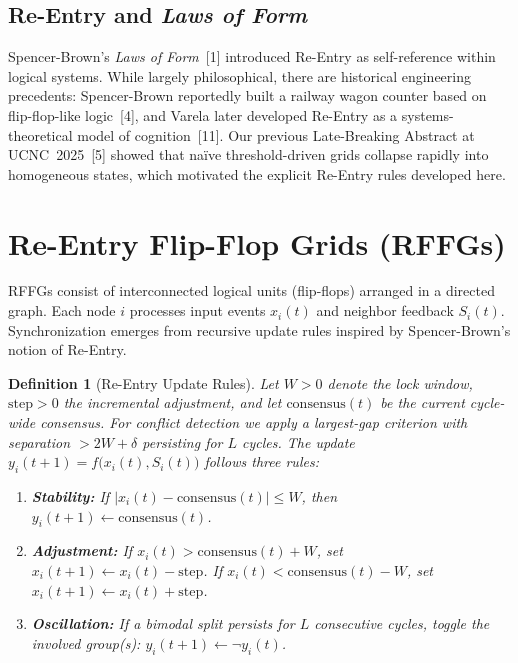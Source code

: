 \documentclass[11pt]{article}
\newtheorem{definition}{Definition}
\begin{document}
\subsection{Re-Entry and \textit{Laws of Form}}
Spencer-Brown’s \textit{Laws of Form}~[1] introduced Re-Entry as self-reference within logical systems. While largely philosophical, there are historical engineering precedents: Spencer-Brown reportedly built a railway wagon counter based on flip-flop-like logic~[4], and Varela later developed Re-Entry as a systems-theoretical model of cognition~[11]. Our previous Late-Breaking Abstract at UCNC~2025~[5] showed that naïve threshold-driven grids collapse rapidly into homogeneous states, which motivated the explicit Re-Entry rules developed here.

\section{Re-Entry Flip-Flop Grids (RFFGs)}
RFFGs consist of interconnected logical units (flip-flops) arranged in a directed graph. 
Each node $i$ processes input events $x_i(t)$ and neighbor feedback $S_i(t)$.
Synchronization emerges from recursive update rules inspired by Spencer-Brown’s notion of Re-Entry.

\begin{definition}[Re-Entry Update Rules]
Let $W>0$ denote the lock window, $\text{step}>0$ the incremental adjustment, and 
let $\mathrm{consensus}(t)$ be the current cycle-wide consensus.
For conflict detection we apply a largest-gap criterion with separation $>2W{+}\delta$ persisting for $L$ cycles.  
The update $y_i(t{+}1) = f\!\big(x_i(t),S_i(t)\big)$ follows three rules:

\begin{enumerate}[label=\textbf{R\arabic*}, leftmargin=1.8em]
  \item \textbf{Stability:}  
  If $\lvert x_i(t)-\mathrm{consensus}(t)\rvert \leq W$, then  
  $y_i(t{+}1) \gets \mathrm{consensus}(t)$.

  \item \textbf{Adjustment:}  
  If $x_i(t)>\mathrm{consensus}(t)+W$, set $x_i(t{+}1)\gets x_i(t)-\text{step}$.  
  If $x_i(t)<\mathrm{consensus}(t)-W$, set $x_i(t{+}1)\gets x_i(t)+\text{step}$.

  \item \textbf{Oscillation:}  
  If a bimodal split persists for $L$ consecutive cycles, toggle the involved group(s):  
  $y_i(t{+}1) \gets \lnot y_i(t)$.
\end{enumerate}
\end{definition}
\end{document}
